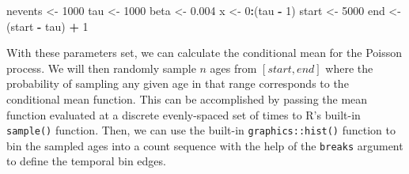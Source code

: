 \documentclass[]{article}
\newenvironment{Shaded}{\begin{snugshade}}{\end{snugshade}}
\newcommand{\KeywordTok}[1]{\textcolor[rgb]{0.13,0.29,0.53}{\textbf{#1}}}
\newcommand{\DataTypeTok}[1]{\textcolor[rgb]{0.13,0.29,0.53}{#1}}
\newcommand{\DecValTok}[1]{\textcolor[rgb]{0.00,0.00,0.81}{#1}}
\newcommand{\FloatTok}[1]{\textcolor[rgb]{0.00,0.00,0.81}{#1}}
\newcommand{\StringTok}[1]{\textcolor[rgb]{0.31,0.60,0.02}{#1}}
\newcommand{\OtherTok}[1]{\textcolor[rgb]{0.56,0.35,0.01}{#1}}
\newcommand{\OperatorTok}[1]{\textcolor[rgb]{0.81,0.36,0.00}{\textbf{#1}}}
\newcommand{\NormalTok}[1]{#1}
\begin{document}
\begin{Shaded}
\begin{Highlighting}[]
\NormalTok{nevents <-}\StringTok{ }\DecValTok{1000}
\NormalTok{tau <-}\StringTok{ }\DecValTok{1000}
\NormalTok{beta <-}\StringTok{ }\FloatTok{0.004}
\NormalTok{x <-}\StringTok{ }\DecValTok{0}\OperatorTok{:}\NormalTok{(tau }\OperatorTok{-}\StringTok{ }\DecValTok{1}\NormalTok{)}
\NormalTok{start <-}\StringTok{ }\DecValTok{5000}
\NormalTok{end <-}\StringTok{ }\NormalTok{(start }\OperatorTok{-}\StringTok{ }\NormalTok{tau) }\OperatorTok{+}\StringTok{ }\DecValTok{1}
\end{Highlighting}
\end{Shaded}

With these parameters set, we can calculate the conditional mean for the
Poisson process. We will then randomly sample \(n\) ages from
\([start, end]\) where the probability of sampling any given age in that
range corresponds to the conditional mean function. This can be
accomplished by passing the mean function evaluated at a discrete
evenly-spaced set of times to R's built-in \texttt{sample()} function.
Then, we can use the built-in \texttt{graphics::hist()} function to bin
the sampled ages into a count sequence with the help of the
\texttt{breaks} argument to define the temporal bin edges.

\begin{Shaded}
\end{Shaded}
\end{document}
